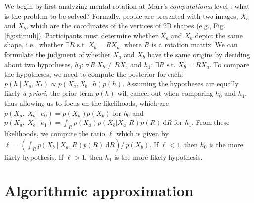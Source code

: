 \documentclass{article} %
\begin{document}
We begin by first analyzing mental rotation at Marr's
\textit{computational} level \cite{Marr:1983to}: what is the problem
to be solved?  Formally, people are presented with two images, $X_a$
and $X_b$, which are the coordinates of the vertices of 2D shapes
(e.g., Fig.  \ref{fig:stimuli}). Participants must determine whether
$X_a$ and $X_b$ depict the same shape, i.e., whether $\exists
R\textrm{ s.t. } X_b=RX_a$, where $R$ is a rotation matrix. We can
formulate the judgment of whether $X_a$ and $X_b$ have the same
origins by deciding about two hypotheses, $h_0$: $\forall R\ X_b\neq
RX_a$ and $h_1$: $\exists R\textrm{ s.t. } X_b=RX_a$.  To compare the
hypotheses, we need to compute the posterior for each: $p(h\ \vert\
X_a, X_b)\propto p(X_a, X_b\ \vert\ h)p(h)$. Assuming the hypotheses
are equally likely \textit{a priori}, the prior term $p(h)$ will
cancel out when comparing $h_0$ and $h_1$, thus allowing us to focus
on the likelihoods, which are $p(X_a,\ X_b\ \vert \ h_0)=p(X_a)p(X_b)$
for $h_0$ and $p(X_a,\ X_b\ \vert \ h_1)=\int_R p(X_a) p(X_b\vert
X_a,R) p(R)\ \mathrm{d}R$ for $h_1$. From these likelihoods, we
compute the ratio $\ell$ which is given by $\ell=\left(\int_R p(X_b\
  \vert\ X_a, R)p(R)\ \mathrm{d}R\right) /\ p(X_b)$. If $\ell<1$, then
$h_0$ is the more likely hypothesis. If $\ell>1$, then $h_1$ is the
more likely hypothesis.

\section{Algorithmic approximation}
\end{document}
